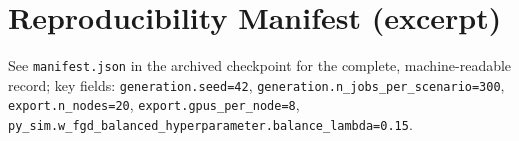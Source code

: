 \documentclass[12pt]{report}
\begin{document}
\chapter{Reproducibility Manifest (excerpt)}
See \texttt{manifest.json} in the archived checkpoint for the complete,
machine-readable record; key fields: \texttt{generation.seed=42},
\texttt{generation.n\_jobs\_per\_scenario=300},
\texttt{export.n\_nodes=20}, \texttt{export.gpus\_per\_node=8},
\texttt{py\_sim.w\_fgd\_balanced\_hyperparameter.balance\_lambda=0.15}.
\end{document}
